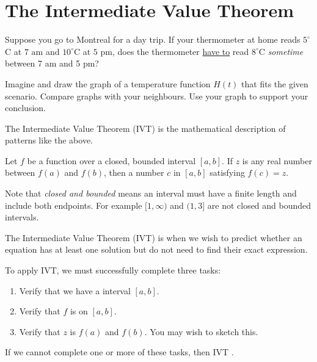 \documentclass[../main.tex]{subfiles}
\begin{document}
 \section{The Intermediate Value Theorem}
\faComments{} Suppose you go to Montreal for a day trip. If your thermometer at home reads \(5^{\circ}\)C at \(7 \text{ am}\) and \({10}^{\circ}\)C at \(5\text{ pm}\), does the thermometer \underline{have to} read \({8}^{\circ}\)C \emph{sometime} between 7 am and 5 pm?


Imagine and draw the graph of a temperature function \(H(t)\) that fits the given scenario. Compare graphs with your neighbours. Use your graph to support your conclusion.

\begin{figure}[!h]  %
  \centering
  
  \label{fig:ivt-motivation}
\end{figure}

%
%
%

The Intermediate Value Theorem (IVT) is the mathematical description of patterns like the above.

\begin{thm} \label{thm:ivt}
  Let \(f\) be a \underline{\hspace{1in}} function over a closed, bounded interval \([a,b]\). If \(z\) is any real number between \(f(a)\) and \(f(b)\), then \underline{\hspace{1in}} a number \(c\) in \([a,b]\) satisfying \(f(c) = z\).

\end{thm}

Note that \emph{closed and bounded} means an interval must have a finite length and include both endpoints. For example \([1,\infty)\) and \((1,3]\) are not closed and bounded intervals.
\clearpage

\faStar{} The Intermediate Value Theorem (IVT) is  when we wish to predict whether an equation has at least one solution but do not need to find their exact expression.

To apply IVT, we must successfully complete three tasks:
\begin{enumerate}[wide, label=(IVT \arabic*)]
  \item Verify that we have a  interval \([a,b]\).
  \item Verify that {\(f\) is  on \([a,b]\)}.
  \item Verify that {\(z\) is  \(f(a)\) and \(f(b)\)}. You may wish to sketch this.
\end{enumerate}
If we cannot complete one or more of these tasks, then IVT .
\end{document}
